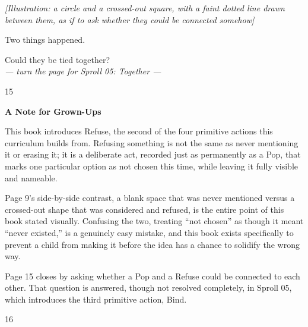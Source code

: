\documentclass[12pt]{book}
\newcommand{\artnote}[1]{{\color{gray!70}\small\itshape [Illustration: #1]}\par\vspace{0.3in}}
\newcommand{\bigline}[1]{{\Huge #1}\par}
\newcommand{\pagenum}[1]{\vfill{\color{gray!50}\footnotesize #1}}
\newcommand{\sprollpage}{\newpage\vspace*{0.4in}}
\begin{document}
\sprollpage
\begin{center}
\vspace*{0.5in}
\artnote{a circle and a crossed-out square, with a faint dotted line drawn between them, as if to ask whether they could be connected somehow}
\vspace{0.35in}
\bigline{Two things happened.}\vspace{0.1in}
{\Large Could they be tied together?}
\vspace{0.4in}\\
{\small \textit{--- turn the page for Sproll 05: Together ---}}
\end{center}
\pagenum{15}

\sprollpage
\vspace*{0.3in}
{\large \textbf{A Note for Grown-Ups}}
\vspace{0.2in}

\normalsize
This book introduces Refuse, the second of the four primitive actions this curriculum builds from. Refusing something is not the same as never mentioning it or erasing it; it is a deliberate act, recorded just as permanently as a Pop, that marks one particular option as not chosen this time, while leaving it fully visible and nameable.

\vspace{0.15in}
Page 9's side-by-side contrast, a blank space that was never mentioned versus a crossed-out shape that was considered and refused, is the entire point of this book stated visually. Confusing the two, treating ``not chosen'' as though it meant ``never existed,'' is a genuinely easy mistake, and this book exists specifically to prevent a child from making it before the idea has a chance to solidify the wrong way.

\vspace{0.15in}
Page 15 closes by asking whether a Pop and a Refuse could be connected to each other. That question is answered, though not resolved completely, in Sproll 05, which introduces the third primitive action, Bind.

\pagenum{16}
\end{document}
